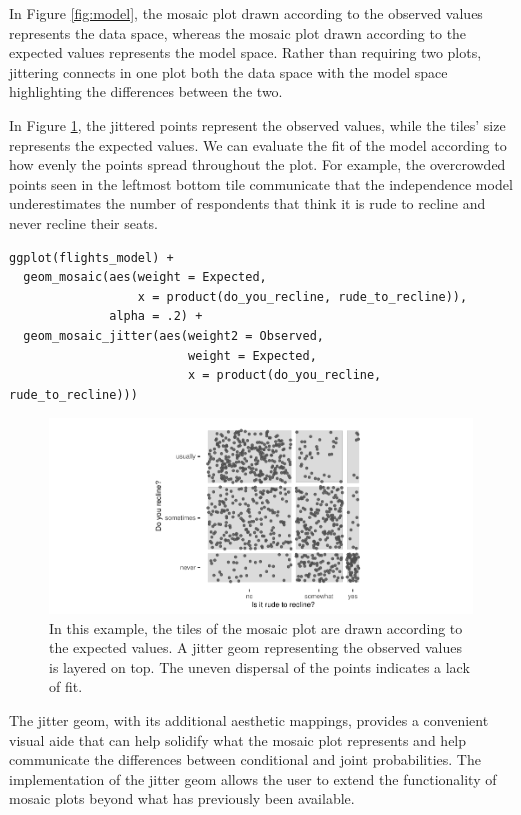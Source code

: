 In Figure \ref{fig:model}, the mosaic plot drawn according to the observed values represents the data space, whereas the mosaic plot drawn according to the expected values represents the model space. Rather than requiring two plots, jittering connects in one plot both the data space with the model space highlighting the differences between the two.

In Figure \ref{fig:weight2}, the jittered points represent the observed values, while the tiles' size represents the expected values. We can evaluate the fit of the model according to how evenly the points spread throughout the plot. For example, the overcrowded points seen in the leftmost bottom tile communicate that the independence model underestimates the number of respondents that think it is rude to recline and never recline their seats.

\begin{verbatim}
ggplot(flights_model) + 
  geom_mosaic(aes(weight = Expected, 
                  x = product(do_you_recline, rude_to_recline)), 
              alpha = .2) +
  geom_mosaic_jitter(aes(weight2 = Observed, 
                         weight = Expected, 
                         x = product(do_you_recline, rude_to_recline)))
\end{verbatim}

\begin{figure}

{\centering \includegraphics[width=1\linewidth]{jeppson-hofmann_files/figure-latex/weight2-1} 

}

\caption{In this example, the tiles of the mosaic plot are drawn according to the expected values. A jitter geom representing the observed values is layered on top. The uneven dispersal of the points indicates a lack of fit.}\label{fig:weight2}
\end{figure}

The jitter geom, with its additional aesthetic mappings, provides a convenient visual aide that can help solidify what the mosaic plot represents and help communicate the differences between conditional and joint probabilities. The implementation of the jitter geom allows the user to extend the functionality of mosaic plots beyond what has previously been available.


